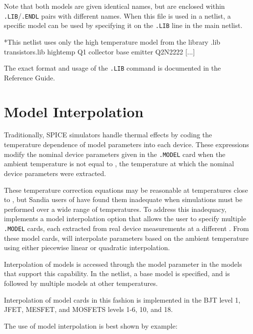 Note that both models are given identical names, but are enclosed
within \texttt{.LIB}/\texttt{.ENDL} pairs with different names.  When
this file is used in a netlist, a specific model can be used by
specifying it on the \texttt{.LIB} line in the main netlist.

\begin{vquote}
*This netlist uses only the high temperature model from the library
.lib transistors.lib hightemp
Q1 collector base emitter Q2N2222
[...]
\end{vquote}

The exact format and usage of the \texttt{.LIB} command is documented in the
\Xyce{} Reference Guide\ReferenceGuide{}.

\section{Model Interpolation}
\label{Model_Interpolation}

Traditionally, SPICE simulators handle thermal effects by coding
the temperature dependence of model parameters into each device.  These
expressions modify the nominal device parameters given in the
\texttt{.MODEL} card when the ambient temperature is not equal to
, the temperature at which the nominal device parameters
were extracted.

These temperature correction equations may be reasonable at
temperatures close to , but Sandia users of \Xyce{} have
found them inadequate when simulations must be performed over a wide
range of temperatures.  To address this inadequacy, \Xyce{} implements
a model interpolation option that allows the user to specify multiple
\texttt{.MODEL} cards, each extracted from real device measurements at
a different .  From these model cards, \Xyce{} will
interpolate parameters based on the ambient temperature using either
piecewise linear or quadratic interpolation.

Interpolation of models is accessed through the model parameter
 in the models that support this capability.  In the netlist,
a base model is specified, and is followed by multiple models at other
temperatures.  

Interpolation of model cards in this fashion is implemented in the BJT
level 1, JFET, MESFET, and MOSFETS levels 1-6, 10, and 18.

The use of model interpolation is best shown by example:

